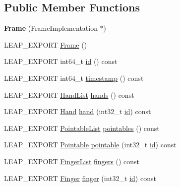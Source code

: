 \subsection*{Public Member Functions}
\begin{DoxyCompactItemize}
\item 
\hypertarget{class_leap_1_1_frame_a95352396f81805bde0b3e1bb76960519}{{\bfseries Frame} (Frame\+Implementation $\ast$)}\label{class_leap_1_1_frame_a95352396f81805bde0b3e1bb76960519}

\item 
L\+E\+A\+P\+\_\+\+E\+X\+P\+O\+R\+T \hyperlink{class_leap_1_1_frame_a6a619578cc80bcdf65f9f332a2432a2f}{Frame} ()
\item 
L\+E\+A\+P\+\_\+\+E\+X\+P\+O\+R\+T int64\+\_\+t \hyperlink{class_leap_1_1_frame_aaa0ab37b441f635a293f577dc9b2d20f}{id} () const 
\item 
L\+E\+A\+P\+\_\+\+E\+X\+P\+O\+R\+T int64\+\_\+t \hyperlink{class_leap_1_1_frame_a631c8c5e5490ee07e7823a62e432dfea}{timestamp} () const 
\item 
L\+E\+A\+P\+\_\+\+E\+X\+P\+O\+R\+T \hyperlink{class_leap_1_1_hand_list}{Hand\+List} \hyperlink{class_leap_1_1_frame_ab9e46956b8a90dafdce75803b4b6bdf8}{hands} () const 
\item 
L\+E\+A\+P\+\_\+\+E\+X\+P\+O\+R\+T \hyperlink{class_leap_1_1_hand}{Hand} \hyperlink{class_leap_1_1_frame_a7565082f9b3cdaf12b620c2e1d278912}{hand} (int32\+\_\+t \hyperlink{class_leap_1_1_frame_aaa0ab37b441f635a293f577dc9b2d20f}{id}) const 
\item 
L\+E\+A\+P\+\_\+\+E\+X\+P\+O\+R\+T \hyperlink{class_leap_1_1_pointable_list}{Pointable\+List} \hyperlink{class_leap_1_1_frame_a1bc989343a3b971568368c77b5869fb9}{pointables} () const 
\item 
L\+E\+A\+P\+\_\+\+E\+X\+P\+O\+R\+T \hyperlink{class_leap_1_1_pointable}{Pointable} \hyperlink{class_leap_1_1_frame_a965d1e23e9ad84420359711768ff1fab}{pointable} (int32\+\_\+t \hyperlink{class_leap_1_1_frame_aaa0ab37b441f635a293f577dc9b2d20f}{id}) const 
\item 
L\+E\+A\+P\+\_\+\+E\+X\+P\+O\+R\+T \hyperlink{class_leap_1_1_finger_list}{Finger\+List} \hyperlink{class_leap_1_1_frame_abff33c86515d42793abf134e359e5142}{fingers} () const 
\item 
L\+E\+A\+P\+\_\+\+E\+X\+P\+O\+R\+T \hyperlink{class_leap_1_1_finger}{Finger} \hyperlink{class_leap_1_1_frame_a2f146a5c9103c9708dc4d120d18f6c40}{finger} (int32\+\_\+t \hyperlink{class_leap_1_1_frame_aaa0ab37b441f635a293f577dc9b2d20f}{id}) const 
\item 

\end{DoxyCompactItemize}

